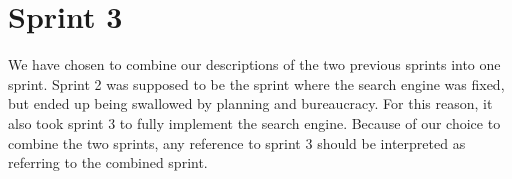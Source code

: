 \chapter{Sprint 3}
We have chosen to combine our descriptions of the two previous sprints into one sprint. Sprint 2 was supposed to be the sprint where the search engine was fixed, but ended up being swallowed by planning and bureaucracy. For this reason, it also took sprint 3 to fully implement the search engine. Because of our choice to combine the two sprints, any reference to sprint 3 should be interpreted as referring to the combined sprint.






